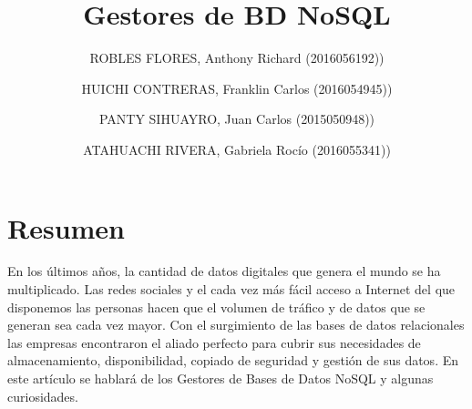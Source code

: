 \documentclass[preprint,12pt]{elsarticle}
\begin{document}
	
	\begin{frontmatter} 

		\title{\huge Gestores de BD NoSQL}
		
		\author{ROBLES FLORES, Anthony Richard     (2016056192))}
		\author{HUICHI CONTRERAS, Franklin Carlos          	(2016054945))}
		\author{PANTY SIHUAYRO, Juan Carlos         	(2015050948))}  
		\author{ATAHUACHI RIVERA, Gabriela Rocío                (2016055341))} 
		\address{Escuela Profesional de Ingeniería de Sistemas}
		\address{Universidad Privada de Tacna}
		\address{Tacna, Perú}
		

		\begin{abstract}
		


		\end{abstract}


	\end{frontmatter}


\section{Resumen}
En los últimos años, la cantidad de datos digitales que genera el mundo se ha
multiplicado. Las redes sociales y el cada vez más fácil acceso a Internet del que
disponemos las personas hacen que el volumen de tráfico y de datos que se generan sea
cada vez mayor.
Con el surgimiento de las bases de datos relacionales las empresas encontraron el aliado
perfecto para cubrir sus necesidades de almacenamiento, disponibilidad, copiado de
seguridad y gestión de sus datos.
En este artículo se hablará de los Gestores de Bases de Datos NoSQL y algunas curiosidades.




\end{document}
